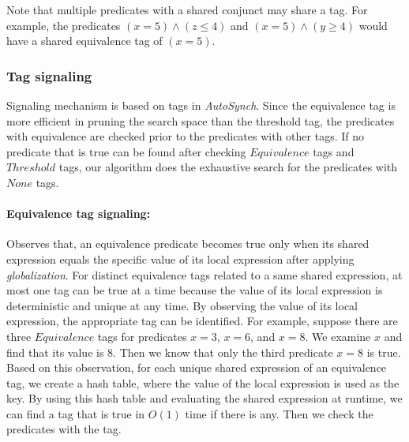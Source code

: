 \documentclass[preprint]{sigplanconf}
\begin{document}
Note that multiple predicates with a shared conjunct may share a tag. For example,
the predicates $(x=5) \wedge (z \leq 4)$ and $(x=5) \wedge (y \geq 4)$ would have a shared equivalence tag
of $(x=5)$.

\subsubsection{Tag signaling}
Signaling mechanism is based on tags in {\em AutoSynch}. 
Since the equivalence tag is more efficient in pruning the search space than the threshold tag, the
predicates with equivalence are checked prior to the predicates with other 
tags. If no predicate that is true can be found after checking $Equivalence$ 
tags and $Threshold$ tags, our algorithm does the exhaustive search for the 
predicates with $None$ tags. 

\paragraph{Equivalence tag signaling:}
Observes that, an equivalence predicate becomes true only when its shared 
expression equals the specific value of its local expression after applying
{\em globalization}. For distinct equivalence tags related to a same shared 
expression, at most one tag can be true at a time because the value of its
local expression is deterministic and unique at any time. By 
observing the value of its local expression, the appropriate tag can be 
identified. For example, suppose there are three $Equivalence$ tags for
predicates $x = 3$, $x = 6$, and $x = 8$. We examine $x$ and find that
its value is $8$. Then we know that only the third predicate $x = 8$ is true. Based on this 
observation, for each unique shared expression of an equivalence tag, we 
create a hash table, where the value of the local expression is used as the 
key. By using this 
hash table and evaluating the shared expression at runtime, we can find a
tag that is true in $O(1)$ time if there is any. Then we check the predicates 
with the tag. 

\end{document}
